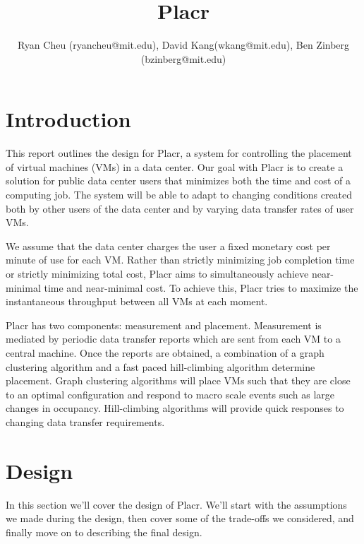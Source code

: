 \documentclass[11pt]{article}
\title{Placr}
\author{Ryan Cheu (ryancheu@mit.edu), David Kang(wkang@mit.edu), Ben Zinberg (bzinberg@mit.edu)}
\begin{document}
\begin{titlepage}

\maketitle

\end{titlepage}

\section{Introduction}

This report outlines the design for Placr, a system for controlling the placement of virtual machines (VMs) in a data center.  Our goal with Placr is to create a solution for public data center users that minimizes both the time and cost of a computing job.  The system will be able to adapt to changing conditions created both by other users of the data center and by varying data transfer rates of user VMs.

We assume that the data center charges the user a fixed monetary cost per minute of use for each VM.  Rather than strictly minimizing job completion time or strictly minimizing total cost, Placr aims to simultaneously achieve near-minimal time and near-minimal cost.  To achieve this, Placr tries to maximize the instantaneous throughput between all VMs at each moment.

Placr has two components: measurement and placement.  Measurement is mediated by periodic data transfer reports which are sent from each VM to a central machine.  Once the reports are obtained, a combination of a graph clustering algorithm and a fast paced hill-climbing algorithm determine placement. Graph clustering algorithms will place VMs such that they are close to an optimal configuration and respond to macro scale events such as large changes in occupancy.  Hill-climbing algorithms will provide quick responses to changing data transfer requirements.

\section{Design}

In this section we'll cover the design of Placr.  We'll start with the assumptions we made during the design, then cover some of the trade-offs we considered, and finally move on to describing the final design.
\end{document}
